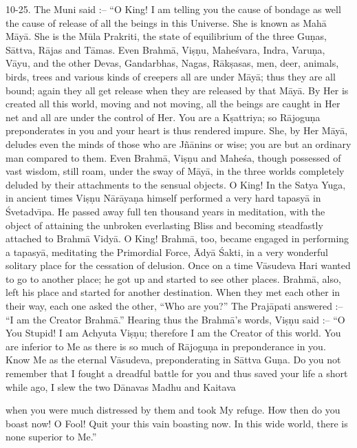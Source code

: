 10-25. The Muni said :-- ``O King! I am telling you the cause of bondage as well the cause of release of all the beings in this Universe. She is known as Mah\=a M\=ay\=a. She is the M\=ula Prakriti, the state of equilibrium of the three Gu\d{n}as, S\=attva, R\=ajas and T\=amas. Even Brahm\=a, Vi\d{s}\d{n}u, Mahe\'svara, Indra, Varu\d{n}a, V\=ayu, and the other Devas, Gandarbhas, Nagas, R\=ak\d{s}asas, men, deer, animals, birds, trees and various kinds of creepers all are under M\=ay\=a; thus they are all bound; again they all get release when they are released by that M\=ay\=a. By Her is created all this world, moving and not moving, all the beings are caught in Her net and all are under the control of Her. You are a K\d{s}attriya; so R\=ajogu\d{n}a preponderates in you and your heart is thus rendered impure. She, by Her M\=ay\=a, deludes even the minds of those who are J\~n\=anins or wise; you are but an ordinary man compared to them. Even Brahm\=a, Vi\d{s}\d{n}u and Mahe\'sa, though possessed of vast wisdom, still roam, under the sway of M\=ay\=a, in the three worlds completely deluded by their attachments to the sensual objects. O King! In the Satya Yuga, in ancient times Vi\d{s}\d{n}u N\=ar\=aya\d{n}a himself performed a very hard tapasy\=a in \'Svetadv\={\i}pa. He passed away full ten thousand years in meditation, with the object of attaining the unbroken everlasting Bliss and becoming steadfastly attached to Brahm\=a Vidy\=a. O King! Brahm\=a, too, became engaged in performing a tapasy\=a, meditating the Primordial Force, \=Ady\=a \'Sakti, in a very wonderful solitary place for the cessation of delusion. Once on a time V\=asudeva Hari wanted to go to another place; he got up and started to see other places. Brahm\=a, also, left his place and started for another destination. When they met each other in their way, each one asked the other, ``Who are you?'' The Praj\=apati answered :-- ``I am the Creator Brahm\=a.'' Hearing thus the Brahm\=a's words, Vi\d{s}\d{n}u said :-- ``O You Stupid! I am Achyuta Vi\d{s}\d{n}u; therefore I am the Creator of this world. You are inferior to Me as there is so much of R\=ajogu\d{n}a in preponderance in you. Know Me as the eternal V\=asudeva, preponderating in S\=attva Gu\d{n}a. Do you not remember that I fought a dreadful battle for you and thus saved your life a short while ago, I slew the two D\=anavas Madhu and Kaitava

when you were much distressed by them and took My refuge. How then do you boast now! O Fool! Quit your this vain boasting now. In this wide world, there is none superior to Me.''

